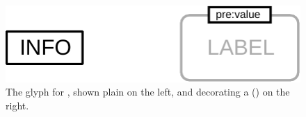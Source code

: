 \begin{figure}[H]
  \centering
  \includegraphics{images/build/unit_information.pdf}
  \caption{The \PD glyph for , shown plain on the left, and decorating a  () on the right.}
  \label{fig:unitInfo}
\end{figure}
